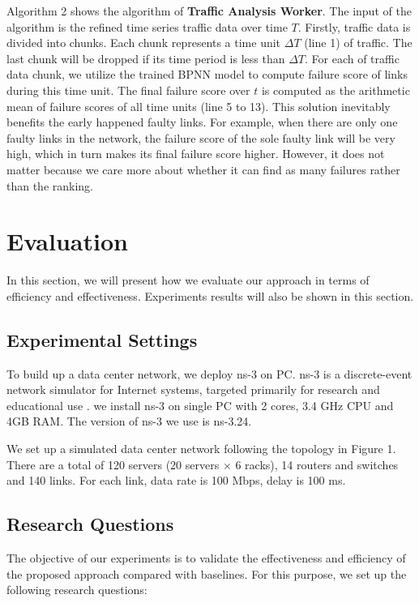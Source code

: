 \documentclass{sig-alternate-05-2015}
\begin{document}
Algorithm 2 shows the algorithm of \textbf{Traffic Analysis Worker}. The input of the algorithm is the refined time series traffic data over time $T$. Firstly, traffic data is divided into chunks. Each chunk represents a time unit $\Delta T$ (line 1) of traffic. The last chunk will be dropped if its time period is less than $\Delta T$. For each of traffic data chunk, we utilize the trained BPNN model to compute failure score of links during this time unit. The final failure score over $t$ is computed as the arithmetic mean of failure scores of all time units (line 5 to 13). This solution inevitably benefits the early happened faulty links. For example, when there are only one faulty links in the network, the failure score of the sole faulty link will be very high, which in turn makes its final failure score higher. However, it does not matter because we care more about whether it can find as many failures rather than the ranking.


\section{Evaluation}
In this section, we will present how we evaluate our approach in terms of efficiency and effectiveness. Experiments results will also be shown in this section.

\subsection{Experimental Settings}
To build up a data center network, we deploy ns-3 on PC. ns-3 is a discrete-event network simulator for Internet systems, targeted primarily for research and educational use \cite{henderson2008network}. we install ns-3 on single PC with 2 cores, 3.4 GHz CPU and 4GB RAM. The version of ns-3 we use is ns-3.24.

We set up a simulated data center network following the topology in Figure 1. There are a total of 120 servers (20 servers $\times$ 6 racks), 14 routers and switches and 140 links. For each link, data rate is 100 Mbps, delay is 100 ms.

\subsection{Research Questions}
The objective of our experiments is to validate the effectiveness and efficiency of the proposed approach compared with baselines. For this purpose, we set up the following research questions:
\end{document}
